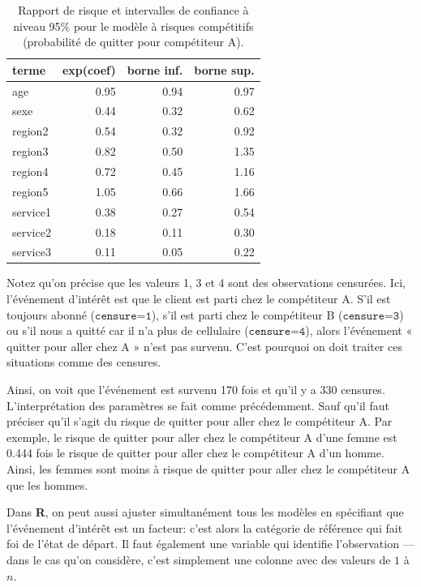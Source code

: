 \documentclass[
  11pt,
  letterpaper,
]{scrbook}
\theoremstyle{definition}
\theoremstyle{remark}
\begin{document}
\begin{longtable}[t]{lrrr}

\caption{\label{tbl-cox-risquecompetA}Rapport de risque et intervalles
de confiance à niveau 95\% pour le modèle à risques compétitifs
(probabilité de quitter pour compétiteur A).}

\tabularnewline

\toprule
terme & exp(coef) & borne inf. & borne sup.\\
\midrule
age & 0.95 & 0.94 & 0.97\\
sexe & 0.44 & 0.32 & 0.62\\
region2 & 0.54 & 0.32 & 0.92\\
region3 & 0.82 & 0.50 & 1.35\\
region4 & 0.72 & 0.45 & 1.16\\
\addlinespace
region5 & 1.05 & 0.66 & 1.66\\
service1 & 0.38 & 0.27 & 0.54\\
service2 & 0.18 & 0.11 & 0.30\\
service3 & 0.11 & 0.05 & 0.22\\
\bottomrule

\end{longtable}

Notez qu'on précise que les valeurs 1, 3 et 4 sont des observations
censurées. Ici, l'événement d'intérêt est que le client est parti chez
le compétiteur A. S'il est toujours abonné (\(\texttt{censure=1}\)),
s'il est parti chez le compétiteur B (\(\texttt{censure=3}\)) ou s'il
nous a quitté car il n'a plus de cellulaire (\(\texttt{censure=4}\)),
alors l'événement « quitter pour aller chez A » n'est pas survenu. C'est
pourquoi on doit traiter ces situations comme des censures.

Ainsi, on voit que l'événement est survenu 170 fois et qu'il y a 330
censures. L'interprétation des paramètres se fait comme précédemment.
Sauf qu'il faut préciser qu'il s'agit du risque de quitter pour aller
chez le compétiteur A. Par exemple, le risque de quitter pour aller chez
le compétiteur A d'une femme est 0.444 fois le risque de quitter pour
aller chez le compétiteur A d'un homme. Ainsi, les femmes sont moins à
risque de quitter pour aller chez le compétiteur A que les hommes.

Dans \textbf{R}, on peut aussi ajuster simultanément tous les modèles en
spécifiant que l'événement d'intérêt est un facteur: c'est alors la
catégorie de référence qui fait foi de l'état de départ. Il faut
également une variable qui identifie l'observation --- dans le cas qu'on
considère, c'est simplement une colonne avec des valeurs de \(1\) à
\(n\).
\end{document}
